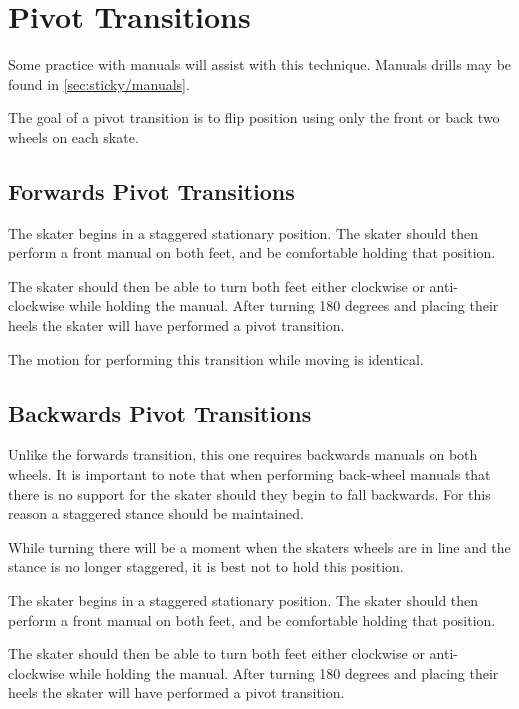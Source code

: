\section{Pivot Transitions}
\label{sec:transitions/pivot}

Some practice with manuals will assist with this technique.
Manuals drills may be found in \ref{sec:sticky/manuals}.


The goal of a pivot transition is to flip position using only the front or back two wheels on each skate.  

\subsection{Forwards Pivot Transitions}
\label{sec:transitions/pivot/forwards}
The skater begins in a staggered stationary position.
The skater should then perform a front manual on both feet, and be comfortable holding that position. 

The skater should then be able to turn both feet either clockwise or anti-clockwise while holding the manual.
After turning 180 degrees and placing their heels the skater will have performed a pivot transition. 

The motion for performing this transition while moving is identical.  

\subsection{Backwards Pivot Transitions}
\label{sec:transitions/pivot/backwards}

Unlike the forwards transition, this one requires backwards manuals on both wheels.
It is important to note that when performing back-wheel manuals that there is no support for the skater should they begin to fall backwards. 
For this reason a staggered stance should be maintained.

While turning there will be a moment when the skaters wheels are in line and the stance is no longer staggered, it is best not to hold this position. 

The skater begins in a staggered stationary position.
The skater should then perform a front manual on both feet, and be comfortable holding that position. 

The skater should then be able to turn both feet either clockwise or anti-clockwise while holding the manual.
After turning 180 degrees and placing their heels the skater will have performed a pivot transition. 

